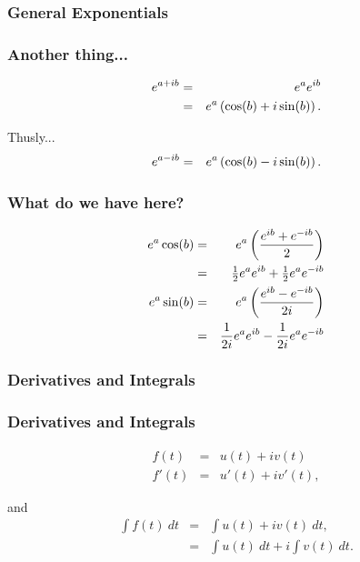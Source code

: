 \subsubsection{General Exponentials}

\begin{frame}
  \frametitle{Another thing...}

  \begin{eqnarray*}
    e^{a+ib} & = & e^a e^{ib} \\
    & = & e^a \left( \cos(b) + i \sin(b) \right).
  \end{eqnarray*}

  Thusly...
  \begin{eqnarray*}
    e^{a-ib} & = & e^a \left( \cos(b) - i \sin(b) \right).
  \end{eqnarray*}

\end{frame}


\begin{frame}
  \frametitle{What do we have here?}

  \begin{eqnarray*}
    e^a \cos(b) & = & e^a \left( \frac{e^{ib}+e^{-ib}}{2} \right) \\
    & = & \mbox{$\frac{1}{2}$} e^a e^{ib} +\mbox{$\frac{1}{2}$} e^a  e^{-ib} \\
    e^a \sin(b) & = & e^a \left( \frac{e^{ib}-e^{-ib}}{2i} \right) \\
    & = & \frac{1}{2i} e^a e^{ib} - \frac{1}{2i} e^a e^{-ib}
  \end{eqnarray*}

\end{frame}

\subsubsection{Derivatives and Integrals}

\begin{frame}
  \frametitle{Derivatives and Integrals}

  \begin{eqnarray*}
    f(t) & = & u(t) + i v(t) \\
    f'(t) & = & u'(t) + i v'(t),
  \end{eqnarray*}

  and
  \begin{eqnarray*}
    \int f(t) ~ dt & = & \int u(t) + i v(t) ~ dt, \\
    & = & \int u(t) ~ dt + i \int v(t) ~ dt.
  \end{eqnarray*}

\end{frame}


